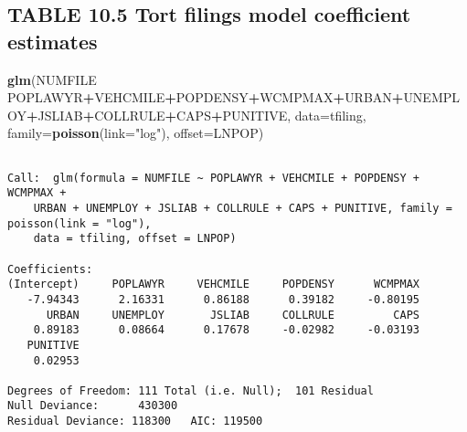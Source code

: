 \documentclass[]{book}
\newenvironment{Shaded}{\begin{snugshade}}{\end{snugshade}}
\newcommand{\DataTypeTok}[1]{\textcolor[rgb]{0.13,0.29,0.53}{#1}}
\newcommand{\DecValTok}[1]{\textcolor[rgb]{0.00,0.00,0.81}{#1}}
\newcommand{\KeywordTok}[1]{\textcolor[rgb]{0.13,0.29,0.53}{\textbf{#1}}}
\newcommand{\NormalTok}[1]{#1}
\newcommand{\OperatorTok}[1]{\textcolor[rgb]{0.81,0.36,0.00}{\textbf{#1}}}
\newcommand{\StringTok}[1]{\textcolor[rgb]{0.31,0.60,0.02}{#1}}
\begin{document}
\hypertarget{table-10.5-tort-filings-model-coefficient-estimates}{%
\subsection{TABLE 10.5 Tort filings model coefficient estimates}\label{table-10.5-tort-filings-model-coefficient-estimates}}

\begin{Shaded}
\begin{Highlighting}[]
\KeywordTok{glm}\NormalTok{(NUMFILE }\OperatorTok{~}\StringTok{ }\NormalTok{POPLAWYR}\OperatorTok{+}\NormalTok{VEHCMILE}\OperatorTok{+}\NormalTok{POPDENSY}\OperatorTok{+}\NormalTok{WCMPMAX}\OperatorTok{+}\NormalTok{URBAN}\OperatorTok{+}\NormalTok{UNEMPLOY}\OperatorTok{+}\NormalTok{JSLIAB}\OperatorTok{+}\NormalTok{COLLRULE}\OperatorTok{+}\NormalTok{CAPS}\OperatorTok{+}\NormalTok{PUNITIVE, }\DataTypeTok{data=}\NormalTok{tfiling, }\DataTypeTok{family=}\KeywordTok{poisson}\NormalTok{(}\DataTypeTok{link=}\StringTok{"log"}\NormalTok{), }\DataTypeTok{offset=}\NormalTok{LNPOP)}
\end{Highlighting}
\end{Shaded}

\begin{verbatim}

Call:  glm(formula = NUMFILE ~ POPLAWYR + VEHCMILE + POPDENSY + WCMPMAX + 
    URBAN + UNEMPLOY + JSLIAB + COLLRULE + CAPS + PUNITIVE, family = poisson(link = "log"), 
    data = tfiling, offset = LNPOP)

Coefficients:
(Intercept)     POPLAWYR     VEHCMILE     POPDENSY      WCMPMAX  
   -7.94343      2.16331      0.86188      0.39182     -0.80195  
      URBAN     UNEMPLOY       JSLIAB     COLLRULE         CAPS  
    0.89183      0.08664      0.17678     -0.02982     -0.03193  
   PUNITIVE  
    0.02953  

Degrees of Freedom: 111 Total (i.e. Null);  101 Residual
Null Deviance:      430300 
Residual Deviance: 118300   AIC: 119500
\end{verbatim}

\begin{Shaded}
\end{Shaded}
\end{document}
